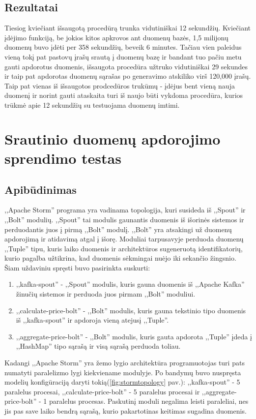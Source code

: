 \documentclass{VUMIFPSkursinis}
\begin{document}
\subsection{Rezultatai}

Tiesiog kviečiant išsaugotą procedūrą trunka vidutiniškai 12 sekundžių. Kviečiant įdėjimo funkciją, be jokios kitos apkrovos ant duomenų bazės, 1,5 milijonų duomenų
buvo įdėti per 358 sekundžių, beveik 6 minutes. Tačiau vien paleidus vieną tokį pat pastovų įrašų srautą į duomenų bazę ir bandant tuo pačiu metu gauti apdorotus duomenis, išsaugota
procedūra užtruko vidutiniškai 29 sekundes ir taip pat apdorotas duomenų sąrašas po generavimo atskiliko virš 120,000 įrašų. Taip pat vienas iš 
išsaugotos prodcedūros trukūmų - įdėjus bent vieną nauja duomenį ir norint gauti ataskaita turi iš naujo būti vykdoma procedūra, kurios trūkmė apie 12 sekundžių
su testuojama duomenų imtimi.

\section{Srautinio duomenų apdorojimo sprendimo testas}

\subsection{Apibūdinimas}

,,Apache Storm'' programa yra vadinama topologija, kuri susideda iš ,,Spout'' ir ,,Bolt'' modulių. ,,Spout'' tai modulis gaunantis duomenis
iš išorinės sistemos ir perduodantis juos į pirmą ,,Bolt'' modulį. ,,Bolt'' yra atsakingi už duomenų apdorojimą ir atidavimą atgal į išorę.
Moduliai tarpusavyje perduoda duomenų ,,Tuple'' tipu, kuris laiko duomenis ir architektūros sugeneruotą identifikatorių, 
kurio pagalba užtikrina, kad duomenis sėkmingai nuėjo iki sekančio žingsnio. 
Šiam uždaviniu spręsti buvo pasirinkta suskurti:
\begin{enumerate}
    \item ,,kafka-spout'' - ,,Spout'' modulis, kuris gauna duomenis iš ,,Apache Kafka'' žinučių sistemos ir perduoda juos pirmam ,,Bolt'' moduliui.
    \item ,,calculate-price-bolt'' - ,,Bolt'' modulis, kuris gauna tekstinio tipo duomenis iš ,,kafka-spout'' ir apdoroja vieną atejusį ,,Tuple''.
    \item ,,aggregate-price-bolt'' - ,,Bolt'' modulis, kuris gauta apdorota ,,Tuple'' įdeda į ,,HashMap'' tipo sąrašą ir visą sąrašą perduoda toliau.  
\end{enumerate}\par
Kadangi ,,Apache Storm'' yra žemo lygio architektūra programuotojas turi pats numatyti paralelizmo lygi kiekviename modulyje. 
Po bandymų buvo nuspręsta modelių konfigūraciją daryti tokią(\ref{fig:stormtopology} pav.): ,,kafka-spout'' - 5 paralelus procesai, ,,calculate-price-bolt''
 - 5 paralelus procesai ir ,,aggregate-price-bolt'' - 1 paralelus procesas. Paskutinį moduli negalima leisti paraleliai, nes jis pas save 
 laiko bendrą sąrašą, kurio pakartotinas keitimas sugadina duomenis.\par
\end{document}
